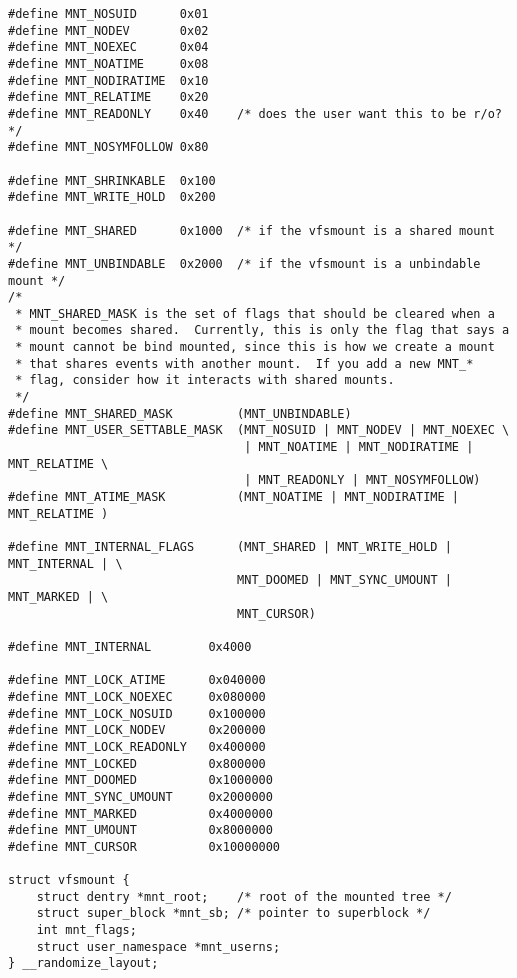 
\begin{lstlisting}
#define MNT_NOSUID	    0x01
#define MNT_NODEV	    0x02
#define MNT_NOEXEC	    0x04
#define MNT_NOATIME	    0x08
#define MNT_NODIRATIME	0x10
#define MNT_RELATIME	0x20
#define MNT_READONLY	0x40	/* does the user want this to be r/o? */
#define MNT_NOSYMFOLLOW	0x80

#define MNT_SHRINKABLE	0x100
#define MNT_WRITE_HOLD	0x200

#define MNT_SHARED	    0x1000	/* if the vfsmount is a shared mount */
#define MNT_UNBINDABLE	0x2000	/* if the vfsmount is a unbindable mount */
/*
 * MNT_SHARED_MASK is the set of flags that should be cleared when a
 * mount becomes shared.  Currently, this is only the flag that says a
 * mount cannot be bind mounted, since this is how we create a mount
 * that shares events with another mount.  If you add a new MNT_*
 * flag, consider how it interacts with shared mounts.
 */
#define MNT_SHARED_MASK	        (MNT_UNBINDABLE)
#define MNT_USER_SETTABLE_MASK  (MNT_NOSUID | MNT_NODEV | MNT_NOEXEC \
                				 | MNT_NOATIME | MNT_NODIRATIME | MNT_RELATIME \
			                	 | MNT_READONLY | MNT_NOSYMFOLLOW)
#define MNT_ATIME_MASK          (MNT_NOATIME | MNT_NODIRATIME | MNT_RELATIME )

#define MNT_INTERNAL_FLAGS      (MNT_SHARED | MNT_WRITE_HOLD | MNT_INTERNAL | \
		                	    MNT_DOOMED | MNT_SYNC_UMOUNT | MNT_MARKED | \
			                    MNT_CURSOR)

#define MNT_INTERNAL	    0x4000

#define MNT_LOCK_ATIME		0x040000
#define MNT_LOCK_NOEXEC		0x080000
#define MNT_LOCK_NOSUID		0x100000
#define MNT_LOCK_NODEV		0x200000
#define MNT_LOCK_READONLY	0x400000
#define MNT_LOCKED		    0x800000
#define MNT_DOOMED		    0x1000000
#define MNT_SYNC_UMOUNT		0x2000000
#define MNT_MARKED		    0x4000000
#define MNT_UMOUNT		    0x8000000
#define MNT_CURSOR		    0x10000000

struct vfsmount {
	struct dentry *mnt_root;	/* root of the mounted tree */
	struct super_block *mnt_sb;	/* pointer to superblock */
	int mnt_flags;
	struct user_namespace *mnt_userns;
} __randomize_layout;
\end{lstlisting}